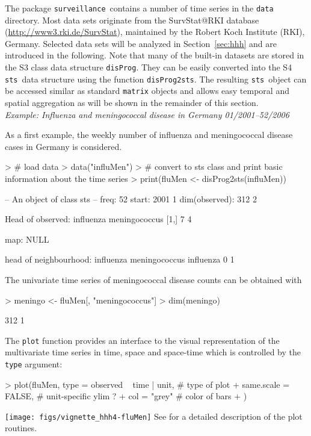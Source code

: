 \documentclass[a4paper,11pt]{article}
\newcommand{\surveillance}{\texttt{surveillance}}
\newcommand{\code}[1]{\texttt{#1}}
\newcommand{\sts}{\texttt{sts}}
\newcommand{\example}[1]{\textit{Example: #1}}
\begin{document}
The package \surveillance\ contains a number of time series in the \code{data}
directory. Most data sets originate from the SurvStat@RKI database 
(\url{http://www3.rki.de/SurvStat}), maintained by the Robert Koch Institute 
(RKI), Germany. Selected data sets will be analyzed in Section~\ref{sec:hhh} 
and are introduced in the following. Note that many of the built-in datasets 
are stored in the S3 class data structure \code{disProg}. 
They can be easily converted into the S4 \sts\ data structure using
the function \code{disProg2sts}. The resulting \sts\ object can be accessed 
similar as standard \code{matrix} objects and allows easy temporal and spatial
aggregation as will be shown in the remainder of this section. \\

\example{Influenza and meningococcal disease in Germany 01/2001--52/2006}

As a first example, the weekly number of influenza and meningococcal disease 
cases in Germany is considered.
\begin{Schunk}
\begin{Sinput}
> # load data
> data("influMen")
> # convert to sts class and print basic information about the time series
> print(fluMen <- disProg2sts(influMen))
\end{Sinput}
\begin{Soutput}
-- An object of class sts -- 
freq:		 52 
start:		 2001 1 
dim(observed):	 312 2 

Head of observed:
     influenza meningococcus
[1,]         7             4

map:
NULL

head of neighbourhood:
          influenza meningococcus
influenza         0             1
\end{Soutput}
\end{Schunk}
The univariate time series of meningococcal disease counts can be obtained
with
\begin{Schunk}
\begin{Sinput}
> meningo <- fluMen[, "meningococcus"]
> dim(meningo)
\end{Sinput}
\begin{Soutput}
[1] 312   1
\end{Soutput}
\end{Schunk}
The \code{plot} function provides an interface to the visual representation
of the multivariate time series in time, space and space-time which is
controlled by the \code{type} argument:
\begin{Schunk}
\begin{Sinput}
> plot(fluMen, type = observed ~ time | unit, # type of plot
+              same.scale = FALSE,            # unit-specific ylim ?
+              col = "grey"                   # color of bars
+              )
\end{Sinput}
\end{Schunk}
\texttt{[image: figs/vignette\_hhh4-fluMen]}
See \cite{hoehle-mazick-2010} for a detailed description of the plot routines.\\
\end{document}
